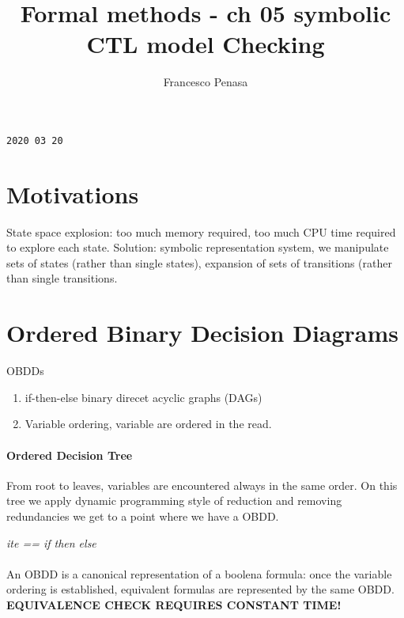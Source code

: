 \documentclass[11pt]{article}
\begin{document}
\author{Francesco Penasa}
\title{Formal methods - ch 05 symbolic CTL model Checking}
\maketitle

\medskip

\texttt{2020 03 20}
\section{Motivations} %
\label{sec:motivations}
State space explosion: too much memory required, too much CPU time required to explore each state. Solution: symbolic representation system, we manipulate sets of states (rather than single states), expansion of sets of transitions (rather than single transitions.

\section{Ordered Binary Decision Diagrams} %
\label{sec:ordered_binary_decision_diagrams}
OBDDs 
\begin{enumerate}
	\item if-then-else binary direcet acyclic graphs (DAGs)
	\item Variable ordering, variable are ordered in the read. 
\end{enumerate}
\paragraph{Ordered Decision Tree} %
\label{par:ordered_decision_tree}
From root to leaves, variables are encountered always in the same order.
On this tree we apply dynamic programming style of reduction and removing redundancies we get to a point where we have a OBDD.

\textit{ite == if then else}

\paragraph{} %
\label{par:}
An OBDD is a canonical representation of a boolena formula: once the variable ordering is established, equivalent formulas are represented by the same OBDD. 
\textbf{EQUIVALENCE CHECK REQUIRES CONSTANT TIME!}

\end{document}
